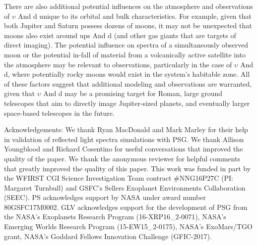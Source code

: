 \documentclass[12pt, letterpaper]{aastex631}
\begin{document}
There are also additional potential influences on the atmosphere and observations of $\upsilon$ And d unique to its orbital and bulk characteristics.  For example, given that both Jupiter and Saturn possess dozens of moons, it may not be unexpected that moons also exist around ups And d (and other gas giants that are targets of direct imaging).  The potential influence on spectra of a simultaneously observed moon or the potential in-fall of material from a volcanically active satellite into the atmosphere may be relevant to observations, particularly in the case of $\upsilon$ And d, where potentially rocky moons would exist in the system's habitable zone.  All of these factors suggest that additional modeling and observations are warranted, given that $\upsilon$ And d may be a promising target for Roman, large ground telescopes that aim to directly image Jupiter-sized planets, and eventually larger space-based telescopes in the future.  





\begin{acknowledgements}

Acknowledgements: We thank Ryan MacDonald and Mark Marley for their help in validation of reflected light spectra simulations with PSG.  We thank Allison Youngblood and Richard Cosentino for useful conversations that improved the quality of the paper. We thank the anonymous reviewer for helpful comments that greatly improved the quality of this paper. This  work  was  funded  in part by  the  WFIRST CGI  Science Investigation Team contract \#NNG16P27C (PI: Margaret Turnbull) and GSFC’s Sellers Exoplanet Environments Collaboration (SEEC). PS acknowledges support by NASA under award number 80GSFC17M0002. GLV acknowledges support for the development of PSG from the NASA’s Exoplanets Research Program (16-XRP16\_2-0071), NASA’s Emerging Worlds Research Program (15-EW15\_2-0175), NASA’s ExoMars/TGO grant, NASA’s Goddard Fellows Innovation Challenge (GFIC-2017). 

\end{acknowledgements}
\end{document}
